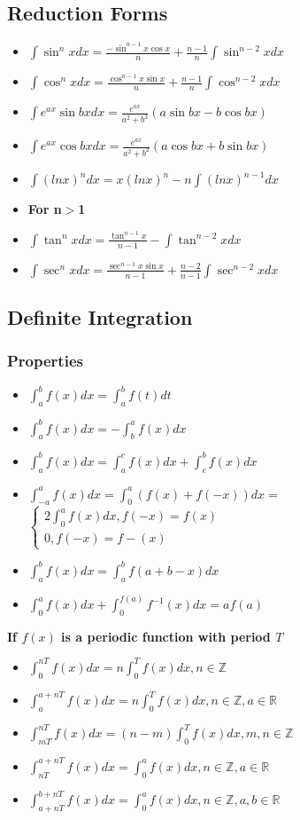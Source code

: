 \documentclass[12pt]{article}
\begin{document}
\subsection{Reduction Forms}
\begin{itemize}
\item $\int \sin^{n}xdx= \frac{-\sin^{n-1}x\cos x}{n}+ \frac{n-1}{n} \int \sin^{n-2}xdx$ 
\item $\int \cos^{n}xdx= \frac{\cos^{n-1}x \sin x}{n}+ \frac{n-1}{n} \int \cos^{n-2}xdx$
\item $\int e^{ax}\sin bxdx = \frac{e^{ax}}{a^2+b^2}(a\sin bx-b\cos bx)$
\item $\int e^{ax}\cos bxdx = \frac{e^{ax}}{a^2+b^2}(a\cos bx+b \sin bx)$
\item $\int (lnx)^{n}dx = x(lnx)^{n} -n \int (lnx)^{n-1}dx$
\item \textbf{For n$>$1} 
\item $\int \tan^{n}xdx= \frac{\tan^{n-1}x}{n-1}- \int \tan^{n-2}xdx$ 
\item $\int \sec^{n}xdx= \frac{\sec^{n-1}x\sin x}{n-1}+ \frac{n-2}{n-1} \int \sec^{n-2}xdx$ 
\end{itemize}
\subsection{Definite Integration}
\subsubsection{Properties}
\begin{itemize}
\item $\int_{a}^{b}f(x)dx=\int_{a}^{b}f(t)dt$
\item $\int_{a}^{b}f(x)dx=-\int_{b}^{a}f(x)dx$
\item $\int_{a}^{b}f(x)dx=\int_{a}^{c}f(x)dx+\int_{c}^{b}f(x)dx$
\item $\int_{-a}^{a}f(x)dx=\int_{0}^{a}(f(x)+f(-x))dx=$ $\begin{cases}
  2\int_{0}^{a}f(x)dx,f(-x)=f(x)\\
  0,f(-x)=f-(x)
\end{cases}$
\item $\int_{a}^{b}f(x)dx=\int_{a}^{b}f(a+b-x)dx$
\item $\int_{0}^{a}f(x)dx + \int_{0}^{f(a)}f^{-1}(x)dx = af(a)$
\end{itemize}

\textbf{If $f(x)$ is a periodic function with period $T$}
\begin{itemize}
\item $\int_{0}^{nT}f(x)dx=n\int_{0}^{T}f(x)dx,n \in \mathbb{Z}$
\item $\int_{a}^{a+nT}f(x)dx=n\int_{0}^{T}f(x)dx, n \in \mathbb{Z},a \in \mathbb{R}$
\item $\int_{mT}^{nT}f(x)dx=(n-m)\int_{0}^{T}f(x)dx, m,n \in \mathbb{Z}$
\item $\int_{nT}^{a+nT}f(x)dx=\int_{0}^{a}f(x)dx, n \in \mathbb{Z}, a \in \mathbb{R}$
\item $\int_{a+nT}^{b+nT}f(x)dx=\int_{0}^{a}f(x)dx,n \in \mathbb{Z}, a,b \in \mathbb{R}$
\end{itemize}
\end{document}
